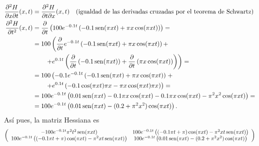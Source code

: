 {\begin{enumerate}
\begin{align*}
\frac{\partial^2 H}{\partial x\partial t}(x,t) &= \frac{\partial^2 H}{\partial t\partial x}(x,t) \quad (\mbox{igualdad de las derivadas cruzadas por el teorema de Schwartz})\\ 
\frac{\partial^2 H}{\partial t^2}(x,t) &= \frac{\partial}{\partial t} \left(100 e^{-0.1t}\left(-0.1 \operatorname{sen}(\pi xt) + \pi x \cos(\pi xt)\right)\right)  =\\
&= 100\left(\frac{\partial}{\partial t} e^{-0.1t}\left(-0.1 \operatorname{sen}(\pi xt) + \pi x \cos(\pi xt)\right) +\right.\\
&\left. \qquad + e^{0.1t}\left(\frac{\partial}{\partial t}\left(-0.1\operatorname{sen}(\pi xt)\right) + \frac{\partial}{\partial t}\left(\pi x \cos(\pi xt)\right)\right)\right) =\\
&= 100\left(-0.1 e^{-0.1t}\left(-0.1 \operatorname{sen}(\pi xt) + \pi x \cos(\pi xt)\right)\right. +\\
&\left. \qquad + e^{0.1t}\left(-0.1\cos(\pi xt)\pi x - \pi x \cos(\pi xt)\pi x\right)\right) =\\
&= 100e^{-0.1t}\left(0.01\operatorname{sen}(\pi xt) -0.1 \pi x \cos(\pi xt) -0.1\pi x\cos(\pi xt) - \pi^2 x^2 \cos(\pi xt)\right) = \\
&= 100e^{-0.1t}\left(0.01\operatorname{sen}(\pi xt) -(0.2+\pi^2x^2) \cos(\pi xt)\right).
\end{align*}
Así pues, la matriz Hessiana es 
\[
\left(
\begin{array}{cc}
-100e^{-0.1t}\pi^2 t^2\operatorname{sen}(\pi xt) & 100e^{-0.1t}\left((-0.1\pi t+\pi)\cos(\pi xt) - \pi^2 xt \operatorname{sen}(\pi xt)\right) \\
100e^{-0.1t}\left((-0.1\pi t+\pi)\cos(\pi xt) - \pi^2 xt \operatorname{sen}(\pi xt)\right) & 100e^{-0.1t}\left(0.01\operatorname{sen}(\pi xt) -(0.2+\pi^2x^2) \cos(\pi xt)\right)
\end{array}
\right)
\]
\end{enumerate}
}


